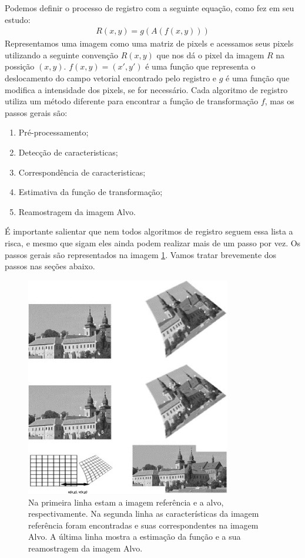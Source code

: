 Podemos definir o processo de registro com a seguinte equação, como \cite{brown1992survey} fez em seu estudo:
\begin{align}\label{eq:defregistro}
    R(x,y) = g(A(f(x,y)))
\end{align}
    Representamos uma imagem como uma matriz de pixels e acessamos seus pixels utilizando a seguinte convenção $R(x,y)$ 
que nos dá o pixel da imagem $R$ na possição $(x,y)$. $f(x,y) = (x',y')$ é uma função que representa o deslocamento do 
campo vetorial encontrado pelo registro e $g$ é uma função que modifica a intensidade dos pixels, se for necessário. 
Cada algoritmo de registro utiliza um método diferente para encontrar a função de transformação $f$, mas os passos gerais são:
\begin{enumerate}
    \item Pré-processamento;
    \item Detecção de caracteristicas;
    \item Correspondência de caracteristicas;
    \item Estimativa da função de transformação;
    \item Reamostragem da imagem Alvo.
\end{enumerate}
    É importante salientar que nem todos algoritmos de registro seguem essa lista a risca, e mesmo que sigam eles ainda
podem realizar mais de um passo por vez. Os passos gerais são representados na imagem \ref{fig:regExplicacao}. 
Vamos tratar brevemente dos passos nas seções abaixo.
\begin{figure}[H]
    \centering
    \includegraphics[width=0.8\textwidth]{figuras/regSteps.jpg}
    \caption{Na primeira linha estam a imagem referência e a alvo, respectivamente. Na segunda linha as características
da imagem referência foram encontradas e suas correspondentes na imagem Alvo. A última linha mostra a estimação da 
função e a sua reamostragem da imagem Alvo. \citep{zitova2003image}}
    \label{fig:regExplicacao}
\end{figure}

